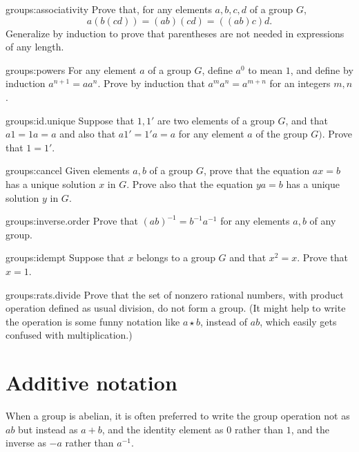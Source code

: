 \begin{problem}{groups:associativity}
Prove that, for any elements \(a,b,c,d\) of a group \(G\), 
\[
a(b(cd))=(ab)(cd)=((ab)c)d.
\]
Generalize by induction to prove that parentheses are not needed in expressions of any length.
\end{problem}

\begin{problem}{groups:powers}
For any element \(a\) of a group \(G\), define \(a^0\) to mean \(1\), and define by induction \(a^{n+1}=aa^n\).
Prove by induction that \(a^ma^n=a^{m+n}\) for an integers \(m,n\).
\end{problem}

\begin{problem}{groups:id.unique}
Suppose that \(1,1'\) are two elements of a group \(G\), and that \(a1=1a=a\) and also that \(a1'=1'a=a\) for any element \(a\) of the group \(G)\).
Prove that \(1=1'\).
\end{problem}

\begin{problem}{groups:cancel}
Given elements \(a, b\) of a group \(G\), prove that the equation \(ax=b\) has a unique solution \(x\) in \(G\).
Prove also that the equation \(ya=b\) has a unique solution \(y\) in \(G\).
\end{problem}

\begin{problem}{groups:inverse.order}
Prove that \((ab)^{-1}=b^{-1}a^{-1}\) for any elements \(a,b\) of any group.
\end{problem}

\begin{problem}{groups:idempt}
Suppose that \(x\) belongs to a group \(G\) and that \(x^2=x\).
Prove that \(x=1\).
\end{problem}

\begin{problem}{groups:rats.divide}
Prove that the set of nonzero rational numbers, with product operation defined as usual division, do not form a group.
(It might help to write the operation is some funny notation like \(a \star b\), instead of \(ab\), which easily gets confused with multiplication.)
\end{problem}



\section{Additive notation}
When a group is abelian, it is often preferred to write the group operation not as \(ab\) but instead as \(a+b\), and the identity element as \(0\) rather than \(1\), and the inverse as \(-a\) rather than \(a^{-1}\).

